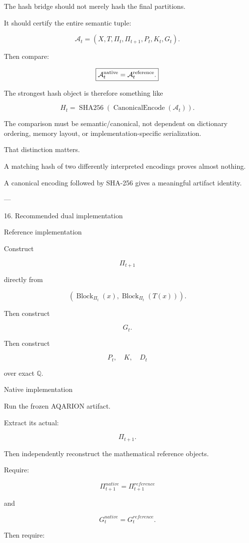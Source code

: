 The hash bridge should not merely hash the final partitions.

It should certify the entire semantic tuple:

\[
\mathcal A_t=
(X,T,\Pi_t,\Pi_{t+1},
P_t,K_t,G_t).
\]

Then compare:

\[
\boxed{
\mathcal A_t^{\rm native}
=
\mathcal A_t^{\rm reference}.
}
\]

The strongest hash object is therefore something like

\[
H_t=
\operatorname{SHA256}
\left(
\operatorname{CanonicalEncode}(\mathcal A_t)
\right).
\]

The comparison must be semantic/canonical, not dependent on dictionary ordering, memory layout, or implementation-specific serialization.

That distinction matters.

A matching hash of two differently interpreted encodings proves almost nothing.

A canonical encoding followed by SHA-256 gives a meaningful artifact identity.


---

16. Recommended dual implementation

Reference implementation

Construct

\[
\Pi_{t+1}
\]

directly from

\[
(\operatorname{Block}_{\Pi_t}(x),
 \operatorname{Block}_{\Pi_t}(T(x))).
\]

Then construct

\[
G_t.
\]

Then construct

\[
P_t,\quad K,\quad D_t
\]

over exact \(\mathbb Q\).

Native implementation

Run the frozen AQARION artifact.

Extract its actual:

\[
\Pi_{t+1}.
\]

Then independently reconstruct the mathematical reference objects.

Require:

\[
\boxed{
\Pi_{t+1}^{native}
=
\Pi_{t+1}^{reference}
}
\]

and

\[
\boxed{
G_t^{native}
=
G_t^{reference}.
}
\]

Then require:

